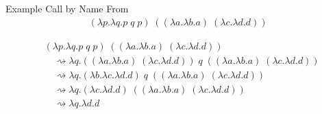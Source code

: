 \documentclass[10pt]{beamer}
\newcommand{\lam}[2]{\lambda #1 . #2}
\newcommand{\app}[2]{#1 \; #2}
\begin{document}
\newcommand*{\myt}{\lam{a}{\lam{b}{a}}} %
\newcommand*{\myf}{\lam{c}{\lam{d}{d}}} %
\begin{frame}
  \begin{exampleblock}{Example Call by Name}
    From \cite{SE101672}
    \begin{align*}
      \app{(\lam{p}{\lam{q}{\app{\app{p}{q}}{p}}})}{(\app{(\myt)}{(\myf)})}
    \end{align*}




    \begin{align*}
       & \app{(\lam{p}{\lam{q}{\app{\app{p}{q}}{p}}})}{(\app{(\myt)}{(\myf)})} \\
       & \quad \rightsquigarrow \lam{q}{
        \app{
          \app{(\app{(\myt)}{(\myf)})}{q}
      }{(\app{(\myt)}{(\myf)})}}                                               \\
       & \quad \rightsquigarrow \lam{q}{
        \app{
          \app{(
            \lam{b}{\myf}
            )}{q}
      }{(\app{(\myt)}{(\myf)})}}                                               \\
       & \quad \rightsquigarrow \lam{q}{
        \app{
          (\myf)
      }{(\app{(\myt)}{(\myf)})}}                                               \\
       & \quad \rightsquigarrow \lam{q}{\lam{d}{d}}
    \end{align*}


  \end{exampleblock}

\end{frame}
\end{document}
